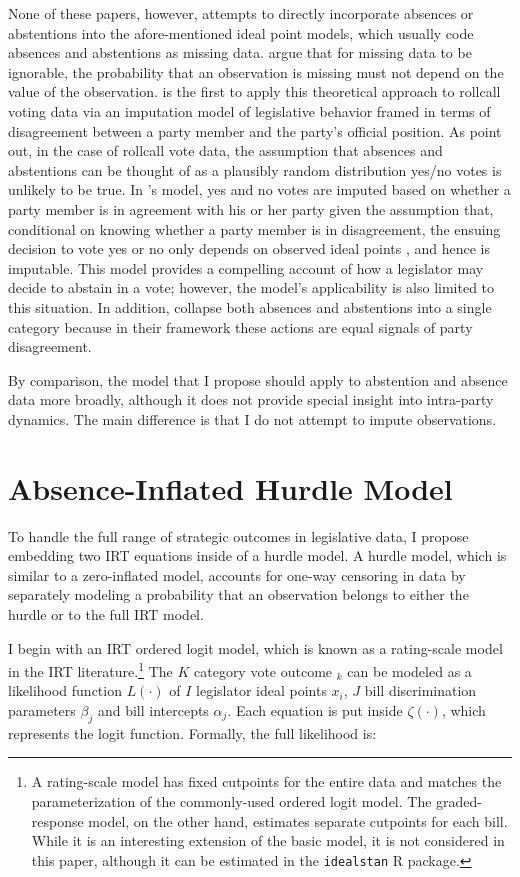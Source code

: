 	None of these papers, however, attempts to directly incorporate absences or abstentions into the afore-mentioned ideal point models, which usually code absences and abstentions as missing data. \textcite{rubin2002} argue that for missing data to be ignorable, the probability that an observation is missing must not depend on the value of the observation. \textcite{rosas2015} is the first to apply this theoretical approach to rollcall voting data via an imputation model of legislative behavior framed in terms of disagreement between a party member and the party's official position.  As \textcite{rosas2015} point out, in the case of rollcall vote data, the assumption that absences and abstentions can be thought of as a plausibly random distribution yes/no votes is unlikely to be true. In \citeauthor{rosas2015}'s model, yes and no votes are imputed based on whether a party member is in agreement with his or her party given the assumption that, conditional on knowing whether a party member is in disagreement, the ensuing decision to vote yes or no only depends on observed ideal points \parencite{rubin2002}, and hence is imputable. This model provides a compelling account of how a legislator may decide to abstain in a vote; however, the model's applicability is also limited to this situation. In addition, \citeauthor{rosas2015} collapse both absences and abstentions into a single category because in their framework these actions are equal signals of party disagreement.
	
	By comparison, the model that I propose should apply to abstention and absence data more broadly, although it does not provide special insight into intra-party dynamics. The main difference is that I do not attempt to impute observations. 
	
	
	
	\section*{Absence-Inflated Hurdle Model}
	
	To handle the full range of strategic outcomes in legislative data, I propose embedding two IRT equations inside of a hurdle model. A hurdle model, which is similar to a zero-inflated model, accounts for one-way censoring in data by separately modeling a probability that an observation belongs to either the hurdle or to the full IRT model. 
	
	I begin with an IRT ordered logit model, which is known as a rating-scale model in the IRT literature.\footnote{A rating-scale model has fixed cutpoints for the entire data and matches the parameterization of the commonly-used ordered logit model. The graded-response model, on the other hand, estimates separate cutpoints for each bill. While it is an interesting extension of the basic model, it is not considered in this paper, although it can be estimated in the \texttt{idealstan} R package.} The $K$ category vote outcome $_k$ can be modeled as a likelihood function $L(\cdot)$ of $I$ legislator ideal points $x_i$, $J$ bill discrimination parameters $\beta_j$ and bill intercepts $\alpha_j$. Each equation is put inside $\zeta(\cdot)$, which represents the logit function. Formally, the full likelihood is:
	

